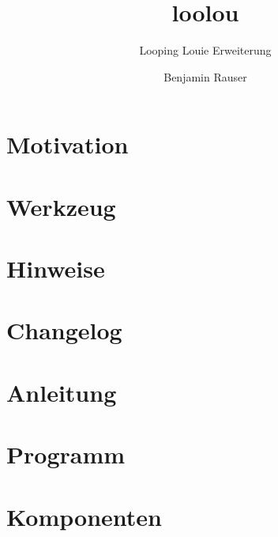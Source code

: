 \documentclass[a4paper]{scrartcl}
\begin{document}
	\author{Benjamin Rauser}
	\title{loolou}
	\subtitle{Looping Louie Erweiterung}

	
	\newpage

	\tableofcontents
	\newpage

	\section{Motivation}
	
	\newpage

	\section{Werkzeug}
	

	\section{Hinweise}
	
	\newpage

	\section{Changelog}
	
	\newpage

	\section{Anleitung}
	
	\newpage

	\section{Programm}
	
	\newpage

	\section{Komponenten}
	
	\newpage
\end{document}
